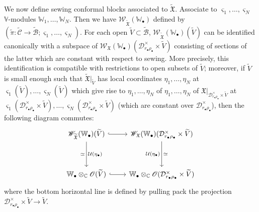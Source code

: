 \documentclass[12pt,a4paper,notitlepage]{article}
\theoremstyle{definition}
\theoremstyle{plain}
\newcommand{\fk}{\mathfrak}
\newcommand{\mc}{\mathcal}
\newcommand{\wtd}{\widetilde}
\newcommand{\scr}{\mathscr}
\newcommand{\sgm}{\varsigma}
\newcommand{\blt}{\bullet}
\newcommand{\Vbb}{\mathbb V}
\newcommand{\Wbb}{\mathbb W}
\newcommand{\Cbb}{\mathbb C}
\numberwithin{equation}{section}
\begin{document}
	
We now define sewing conformal blocks associated to $\wtd{\fk X}$. Associate to $\sgm_1,\dots,\sgm_N$  $\Vbb$-modules $\Wbb_1,\dots,\Wbb_N$. Then we have $\scr W_{\wtd{\fk X}}(\Wbb_\blt)$ defined by $(\wtd\pi:\wtd{\mc C}\rightarrow\wtd{\mc B};\sgm_1,\dots,\sgm_N)$. For each open $\wtd V\subset\wtd{\mc B}$, $\scr W_{\wtd{\fk X}}(\Wbb_\blt)(\wtd V)$ can be identified canonically with a subspace of $\scr W_{\fk X}(\Wbb_\blt)(\mc D_{r_\blt\rho_\blt}^\times\times\wtd V)$ consisting of sections of the latter which are constant with respect to sewing. More precisely, this identification is compatible with restrictions to open subsets of $\wtd V$; moreover, if $\wtd V$ is small enough such that $\wtd{\fk X}|_{\wtd V}$ has local coordinates $\eta_1,\dots,\eta_N$ at $\sgm_1(\wtd V),\dots,\sgm_N(\wtd V)$ which give rise to $\eta_1,\dots,\eta_N$ of $\eta_1,\dots,\eta_N$ of $\fk X|_{\mc D_{r_\blt\rho_\blt}^\times\times\wtd V}$ at $\sgm_1(\mc D_{r_\blt\rho_\blt}^\times\times\wtd V),\dots,\sgm_N(\mc D_{r_\blt\rho_\blt}^\times\times\wtd V)$ (which are constant over $\mc D_{r_\blt\rho_\blt}^\times$), then the following diagram commutes:
\begin{equation}\label{eq28}
\begin{tikzcd}
\scr W_{\wtd{\fk X}}(\Wbb_\blt)(\wtd V) \arrow[r,hook] \arrow[dd,"\simeq"',"\mc U(\eta_\blt)"] &\scr W_{\fk X}(\Wbb_\blt)(\mc D_{r_\blt\rho_\blt}^\times\times\wtd V)\arrow[dd,"\simeq","\mc U(\eta_\blt)"']\\\\
\Wbb_\blt\otimes_\Cbb\scr O(\wtd V) \arrow[r,hook]&\Wbb_\blt\otimes_\Cbb\scr O(\mc D_{r_\blt\rho_\blt}^\times\times\wtd V)
\end{tikzcd}	
\end{equation}
where the bottom horizontal line is defined by pulling pack the projection $\mc D_{r_\blt\rho_\blt}^\times\times\wtd V\rightarrow\wtd V$.
\end{document}
